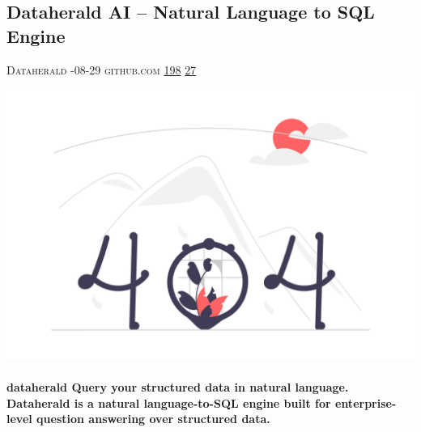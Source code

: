 \documentclass[10pt,a4paper]{article}
\begin{document}
\begin{multicols*}{2}

\noindent\begin{minipage}{\linewidth}
\subsection{Dataherald AI – Natural Language to SQL Engine}
\textsc{\footnotesize
{\scriptsize\faUser}\space 
Dataherald 
{\scriptsize\faCalendar}-08-29 
{\scriptsize\faGithub}\space 
github.com 
{\scriptsize\faThumbsOUp}\space 
\href{http://news.ycombinator.com/item?id=37240363\&utm\_term=comment}{198} 
{\scriptsize\faComments}\space 
\href{http://news.ycombinator.com/item?id=37240363\&utm\_term=comment}{27} 
}
\par\medskip\noindent
\href{https://github.com/Dataherald/dataherald?utm\_source=hackernewsletter\&utm\_medium=email\&utm\_term=data}{
    \includegraphics[width=0.99\linewidth]{notfound.png}
}
\end{minipage}
\paragraph{}
\textbf{dataherald
Query your structured data in natural language.
Dataherald is a natural language-to-SQL engine built for enterprise-level question answering over structured data.}

\end{multicols*}
\end{document}
